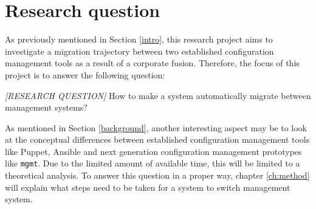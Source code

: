 \chapter{Research question}\label{ch:researchquestion}
As previously mentioned in Section \ref{intro}, this research project aims to investigate a migration trajectory between two established configuration management tools as a result of a corporate fusion. Therefore, the focus of this project is to answer the following question:

\textit{[RESEARCH QUESTION]}
How to make a system automatically migrate between management systems?

As mentioned in Section \ref{background}, another interesting aspect may be to look at the conceptual differences between established configuration management tools like Puppet, Ansible and next generation configuration management prototypes like \texttt{mgmt}. Due to the limited amount of available time, this will be limited to a theoretical analysis. 
To answer this question in a proper way, chapter \ref{ch:method} will explain what steps need to be taken for a system to switch management system.

